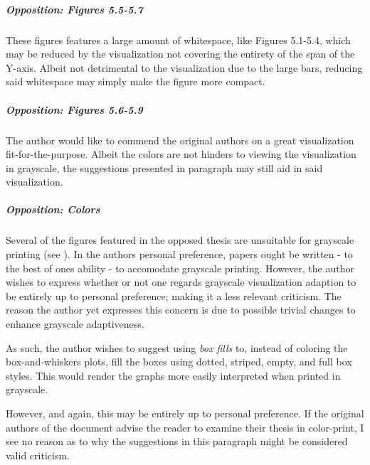 \subparagraph{Opposition: Figures 5.5-5.7}
\label{par:oppositionvisualization_figuresfivepointfivetofivepointseven}
These figures features a large amount of whitespace, like Figures 5.1-5.4, which may be reduced by the visualization not covering the entirety of the span of the Y-axis.
Albeit not detrimental to the visualization due to the large bars, reducing said whitespace may simply make the figure more compact.

\subparagraph{Opposition: Figures 5.6-5.9}
\label{par:oppositionvisualization_figuresfivepointsixtofivepointnine}
The author would like to commend the original authors on a great visualization fit-for-the-purpose.
Albeit the colors are not hinders to viewing the visualization in grayscale, the suggestions presented in paragraph  may still aid in said visualization.

\subparagraph{Opposition: Colors}
\label{par:oppositionvisualization_colors}
Several of the figures featured in the opposed thesis are unsuitable for grayscale printing (see ).
In the authors personal preference, papers ought be written - to the best of ones ability - to accomodate grayscale printing.
However, the author wishes to express whether or not one regards grayscale visualization adaption to be entirely up to personal preference; making it a less relevant criticism.
The reason the author yet expresses this concern is due to possible trivial changes to enhance grayscale adaptiveness.

As such, the author wishes to suggest using \textit{box fills} to, instead of coloring the box-and-whiskers plots, fill the boxes using dotted, striped, empty, and full box styles.
This would render the graphs more easily interpreted when printed in grayscale.

However, and again, this may be entirely up to personal preference.
If the original authors of the document advise the reader to examine their thesis in color-print, I see no reason as to why the suggestions in this paragraph might be considered valid criticism.